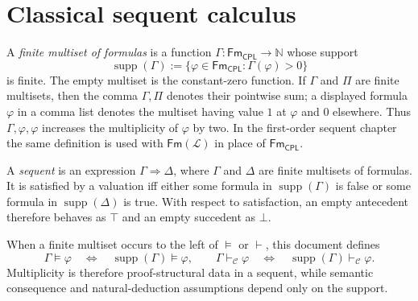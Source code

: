 \documentclass[11pt,oneside,openany]{book}
\theoremstyle{definition}
\newtheorem{definition}{Definition}[chapter]
\theoremstyle{plain}
\theoremstyle{remark}
\let\LogicDefinition\definition
\let\endLogicDefinition\enddefinition
\renewenvironment{definition}[1][]{%
  \LogicDefinition[#1]%
  \if\relax\detokenize{#1}\relax\else\index{#1}\fi
}{\endLogicDefinition}
\newcommand{\N}{\mathbb{N}}
\newcommand{\Lang}{\mathcal{L}}
\newcommand{\Fm}{\mathsf{Fm}}
\newcommand{\entails}{\models}
\newcommand{\derives}{\vdash}
\newcommand{\bottom}{\bot}
\newcommand{\topv}{\top}
\newcommand{\CPL}{\mathsf{CPL}}
\newcommand{\defeq}{\mathrel{:=}}
\begin{document}
\section{Classical sequent calculus}
\label{sec:prop-deduction-02}

\begin{definition}[Sequent]
A \emph{finite multiset of formulas} is a function
\(\Gamma:\Fm_{\CPL}\to\N\) whose support
\[
 \operatorname{supp}(\Gamma)
 \defeq\{\varphi\in\Fm_{\CPL}:\Gamma(\varphi)>0\}
\]
is finite.  The empty multiset is the constant-zero function.  If
\(\Gamma\) and \(\Pi\) are finite multisets, then the comma
\(\Gamma,\Pi\) denotes their pointwise sum; a displayed formula \(\varphi\)
in a comma list denotes the multiset having value \(1\) at \(\varphi\) and
\(0\) elsewhere.  Thus \(\Gamma,\varphi,\varphi\) increases the multiplicity
of \(\varphi\) by two.  In the first-order sequent chapter the same definition
is used with \(\Fm(\Lang)\) in place of \(\Fm_{\CPL}\).

A \emph{sequent} is an expression \(\Gamma\Rightarrow\Delta\), where
\(\Gamma\) and \(\Delta\) are finite multisets of formulas.  It is satisfied
by a valuation iff either some formula in \(\operatorname{supp}(\Gamma)\) is
false or some formula in \(\operatorname{supp}(\Delta)\) is true.  With
respect to satisfaction, an empty antecedent therefore behaves as
\(\topv\) and an empty succedent as \(\bottom\).

When a finite multiset occurs to the left of \(\entails\) or \(\derives\),
this document defines
\[
 \Gamma\entails\varphi
 \quad\Longleftrightarrow\quad
 \operatorname{supp}(\Gamma)\entails\varphi,
 \qquad
 \Gamma\derives_{\mathcal C}\varphi
 \quad\Longleftrightarrow\quad
 \operatorname{supp}(\Gamma)\derives_{\mathcal C}\varphi.
\]
Multiplicity is therefore proof-structural data in a sequent, while semantic
consequence and natural-deduction assumptions depend only on the support.
\end{definition}
\end{document}
